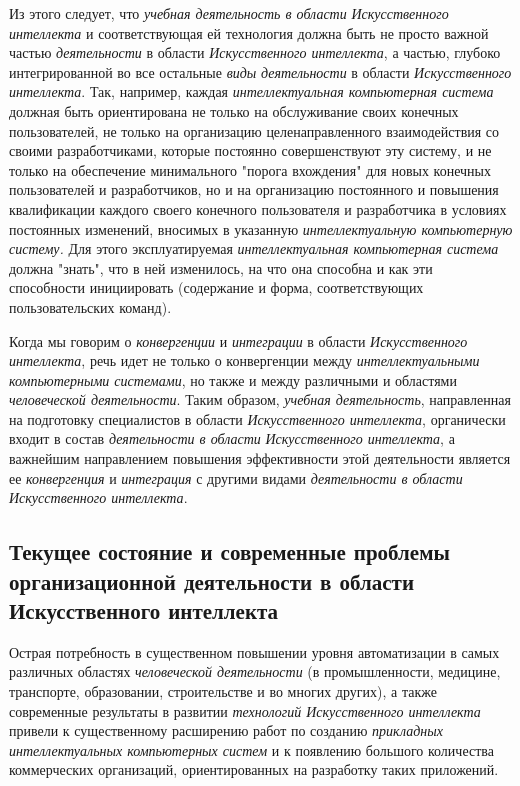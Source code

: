 Из этого следует, что \textit{учебная деятельность в области} \textit{Искусственного интеллекта} и соответствующая ей технология должна быть не просто важной частью \textit{деятельности} в области \textit{Искусственного интеллекта}, а частью, глубоко интегрированной во все остальные \textit{виды} \textit{деятельности} в области \textit{Искусственного интеллекта}. Так, например, каждая \textit{интеллектуальная компьютерная система} должная быть ориентирована не только на обслуживание своих конечных пользователей, не только на организацию целенаправленного взаимодействия со своими разработчиками, которые постоянно совершенствуют эту систему, и не только на обеспечение минимального "порога вхождения"{} для новых конечных пользователей и разработчиков, но и на организацию постоянного и  повышения квалификации каждого своего конечного пользователя и разработчика в условиях постоянных изменений, вносимых в указанную \textit{интеллектуальную компьютерную систему.} Для этого эксплуатируемая \textit{интеллектуальная компьютерная система} должна "знать"{}, что в ней изменилось, на что она способна и как эти способности инициировать (содержание и форма, соответствующих пользовательских команд).

Когда мы говорим о \textit{конвергенции} и \textit{интеграции} в области \textit{Искусственного интеллекта}, речь идет не только о конвергенции между \textit{интеллектуальными компьютерными системами}, но также и между различными  и областями \textit{человеческой деятельности}. Таким образом, \textit{учебная деятельность}, направленная на подготовку специалистов в области \textit{Искусственного интеллекта}, органически входит в состав \textit{деятельности в области} \textit{Искусственного интеллекта}, а важнейшим направлением повышения эффективности этой деятельности является ее \textit{конвергенция} и \textit{интеграция} с другими видами \textit{деятельности в области Искусственного интеллекта}.

\subsection{Текущее состояние и современные проблемы организационной деятельности в области Искусственного интеллекта}
\label{subsec_current_state_and_modern_problems_organizational_activity}

Острая потребность в существенном повышении уровня автоматизации в самых различных областях \textit{человеческой деятельности} (в промышленности, медицине, транспорте, образовании, строительстве и во многих других), а также современные результаты в развитии \textit{технологий Искусственного интеллекта} привели к существенному расширению работ по созданию \textit{прикладных интеллектуальных компьютерных систем} и к появлению большого количества коммерческих организаций, ориентированных на разработку таких приложений.

